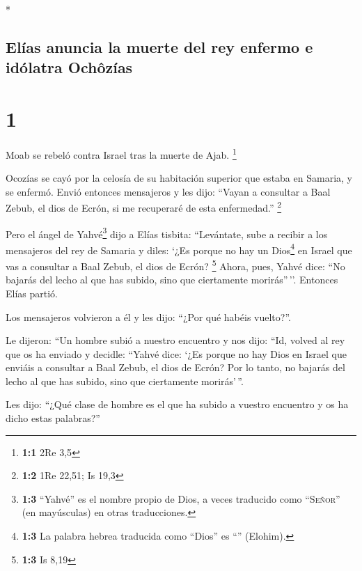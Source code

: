 \begin{paracol}{2} \switchcolumn[0]*

\hypertarget{eluxedas-anuncia-la-muerte-del-rey-enfermo-e-iduxf3latra-ochuxf4zuxedas}{%
\subsection{Elías anuncia la muerte del rey enfermo e idólatra
Ochôzías}\label{eluxedas-anuncia-la-muerte-del-rey-enfermo-e-iduxf3latra-ochuxf4zuxedas}}

\hypertarget{section}{%
\section{1}\label{section}}

 Moab se rebeló contra Israel tras la muerte de Ajab.
\footnote{\textbf{1:1} 2Re 3,5}

 Ocozías se cayó por la celosía de su habitación superior
que estaba en Samaria, y se enfermó. Envió entonces mensajeros y les
dijo: ``Vayan a consultar a Baal Zebub, el dios de Ecrón, si me
recuperaré de esta enfermedad.'' \footnote{\textbf{1:2} 1Re 22,51; Is
  19,3}

 Pero el ángel de Yahvé\footnote{\textbf{1:3} ``Yahvé'' es
  el nombre propio de Dios, a veces traducido como ``\textsc{Señor}''
  (en mayúsculas) en otras traducciones.} dijo a Elías tisbita:
``Levántate, sube a recibir a los mensajeros del rey de Samaria y diles:
`¿Es porque no hay un Dios\footnote{\textbf{1:3} La palabra hebrea
  traducida como ``Dios'' es ``'' (Elohim).} en Israel que
vas a consultar a Baal Zebub, el dios de Ecrón? \footnote{\textbf{1:3}
  Is 8,19}  Ahora, pues, Yahvé dice: ``No bajarás del
lecho al que has subido, sino que ciertamente morirás''\,''. Entonces
Elías partió.

 Los mensajeros volvieron a él y les dijo: ``¿Por qué
habéis vuelto?''.

 Le dijeron: ``Un hombre subió a nuestro encuentro y nos
dijo: ``Id, volved al rey que os ha enviado y decidle: ``Yahvé dice:
`¿Es porque no hay Dios en Israel que enviáis a consultar a Baal Zebub,
el dios de Ecrón? Por lo tanto, no bajarás del lecho al que has subido,
sino que ciertamente morirás'\,''.

 Les dijo: ``¿Qué clase de hombre es el que ha subido a
vuestro encuentro y os ha dicho estas palabras?''


\end{paracol}
